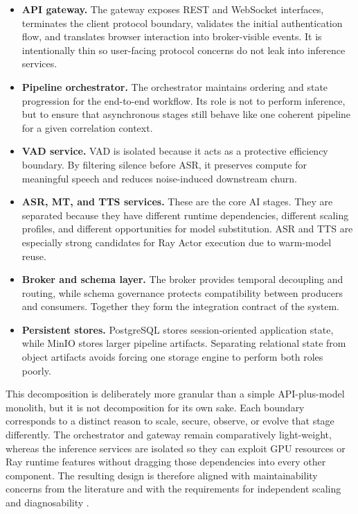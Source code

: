 \begin{itemize}
	\item \textbf{API gateway.} The gateway exposes REST and WebSocket interfaces, terminates the client protocol boundary, validates the initial authentication flow, and translates browser interaction into broker-visible events. It is intentionally thin so user-facing protocol concerns do not leak into inference services.
	\item \textbf{Pipeline orchestrator.} The orchestrator maintains ordering and state progression for the end-to-end workflow. Its role is not to perform inference, but to ensure that asynchronous stages still behave like one coherent pipeline for a given correlation context.
	\item \textbf{VAD service.} VAD is isolated because it acts as a protective efficiency boundary. By filtering silence before ASR, it preserves compute for meaningful speech and reduces noise-induced downstream churn.
	\item \textbf{ASR, MT, and TTS services.} These are the core AI stages. They are separated because they have different runtime dependencies, different scaling profiles, and different opportunities for model substitution. ASR and TTS are especially strong candidates for Ray Actor execution due to warm-model reuse.
	\item \textbf{Broker and schema layer.} The broker provides temporal decoupling and routing, while schema governance protects compatibility between producers and consumers. Together they form the integration contract of the system.
	\item \textbf{Persistent stores.} PostgreSQL stores session-oriented application state, while MinIO stores larger pipeline artifacts. Separating relational state from object artifacts avoids forcing one storage engine to perform both roles poorly.
\end{itemize}

This decomposition is deliberately more granular than a simple API-plus-model monolith, but it is not decomposition for its own sake. Each boundary corresponds to a distinct reason to scale, secure, observe, or evolve that stage differently. The orchestrator and gateway remain comparatively light-weight, whereas the inference services are isolated so they can exploit GPU resources or Ray runtime features without dragging those dependencies into every other component. The resulting design is therefore aligned with maintainability concerns from the literature and with the requirements for independent scaling and diagnosability \cite{newman2019monolith,bass2023engineeringai}.

